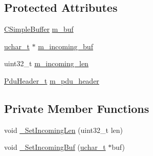 \subsection*{Protected Attributes}
\begin{DoxyCompactItemize}
\item 
\hyperlink{class_c_simple_buffer}{C\+Simple\+Buffer} \hyperlink{class_c_im_pdu_a42eadbe7869ccac9af654b438515e8bc}{m\+\_\+buf}
\item 
\hyperlink{base_2ostype_8h_a124ea0f8f4a23a0a286b5582137f0b8d}{uchar\+\_\+t} $\ast$ \hyperlink{class_c_im_pdu_a6cfa678df6c7f8d273c1b210dcbff9c5}{m\+\_\+incoming\+\_\+buf}
\item 
uint32\+\_\+t \hyperlink{class_c_im_pdu_a0937ed4177688a4606e0264fc14588d1}{m\+\_\+incoming\+\_\+len}
\item 
\hyperlink{struct_pdu_header__t}{Pdu\+Header\+\_\+t} \hyperlink{class_c_im_pdu_a56174680efa94043e03097d14a58faaa}{m\+\_\+pdu\+\_\+header}
\end{DoxyCompactItemize}
\subsection*{Private Member Functions}
\begin{DoxyCompactItemize}
\item 
void \hyperlink{class_c_im_pdu_a12794698a904a554bf760c47bc4568b2}{\+\_\+\+Set\+Incoming\+Len} (uint32\+\_\+t len)
\item 
void \hyperlink{class_c_im_pdu_a719a6787cb389f3116803fc720ad427c}{\+\_\+\+Set\+Incoming\+Buf} (\hyperlink{base_2ostype_8h_a124ea0f8f4a23a0a286b5582137f0b8d}{uchar\+\_\+t} $\ast$buf)
\end{DoxyCompactItemize}
